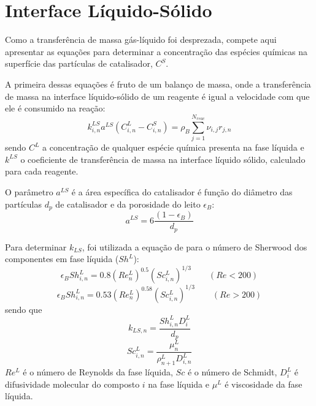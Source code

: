 \section{Interface Líquido-Sólido} \label{sec:interfaceliquidosolido}

Como a transferência de massa gás-líquido foi desprezada, compete aqui
apresentar as equações para determinar a concentração das espécies químicas
na superfície das partículas de catalisador, $C^S$. 

A primeira dessas equações é fruto de um balanço de massa, onde a
transferência de massa na interface líquido-sólido de um reagente é igual a
velocidade com que ele é consumido na reação:
\begin{equation}
k_{i,n}^{LS}a^{LS}(C^L_{i,n}-C^S_{i,n}) = \rho_B
\displaystyle\sum_{j=1}^{N_{reac}}
\nu_{i,j}r_{j,n}
\label{eq:transferenciamassa}
\end{equation}
sendo $C^{L}$ a concentração de qualquer espécie química presenta na fase
líquida e $k^{LS}$ o coeficiente de transferência de massa na interface líquido
sólido, calculado para cada reagente.


O parâmetro $a^{LS}$ é a área específica do catalisador é função do diâmetro
das partículas $d_p$ de catalisador e da porosidade do leito $\epsilon_B$:
\begin{equation}
a^{LS} = 6 \dfrac{(1-\epsilon_B)}{d_p}
\label{eq:aLS}
\end{equation}


Para determinar $k_{LS}$, foi utilizada a equação de 
para o número de Sherwood dos componentes em fase líquida ($Sh^L$):
\begin{equation}
\epsilon_BSh^L_{i,n} = \num{0,8}(Re^L_n)^{\num{0,5}}(Sc^L_{i,n})^{1/3} \qquad
(Re<200)
\label{eq:Sh1}
\end{equation}
\begin{equation}
\epsilon_BSh^L_{i,n} = \num{0,53}(Re^L_n)^{\num{0,58}}(Sc^L_{i,n})^{1/3} \qquad
(Re>200)
\label{eq:Sh2}
\end{equation}
sendo que
\begin{equation}
k_{LS,n} = \dfrac{Sh^L_{i,n}D^L_{i}}{d_p}
\label{eq:kLS}
\end{equation}
\begin{equation} 
Sc^L_{i,n} = \dfrac{\mu^L_{n}}{\rho^L_{n+1}D^L_{i,n}}
\label{eq:Sc}
\end{equation}
$Re^L$ é o número de Reynolds da fase líquida, $Sc$ é o número de Schmidt,
$D^L_{i}$ é difusividade molecular do composto $i$ na fase líquida e $\mu^L$ é
viscosidade da fase líquida.

